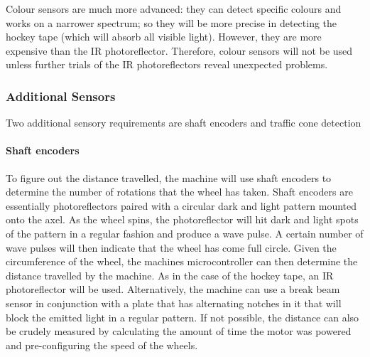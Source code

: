 \documentclass[11pt]{report}
\begin{document}
Colour sensors are much more advanced: they can detect specific colours and works on a narrower spectrum; so they will be more precise in detecting the hockey tape (which will absorb all visible light). However, they are more expensive than the IR photoreflector. Therefore, colour sensors will not be used unless further trials of the IR photoreflectors reveal unexpected problems.

\subsubsection{Additional Sensors}

Two additional sensory requirements are shaft encoders and traffic cone detection

\paragraph{Shaft encoders}
To figure out the distance travelled, the machine will use shaft encoders to determine the number of rotations that the wheel has taken. Shaft encoders are essentially photoreflectors paired with a circular dark and light pattern mounted onto the axel. As the wheel spins, the photoreflector will hit dark and light spots of the pattern in a regular fashion and produce a wave pulse. A certain number of wave pulses will then indicate that the wheel has come full circle. Given the circumference of the wheel, the machines microcontroller can then determine the distance travelled by the machine. 
\newline\newline
As in the case of the hockey tape, an IR photoreflector will be used. Alternatively, the machine can use a break beam sensor in conjunction with a plate that has alternating notches in it that will block the emitted light in a regular pattern. If not possible, the distance can also be crudely measured by calculating the amount of time the motor was powered and pre-configuring the speed of the wheels.
\end{document}
